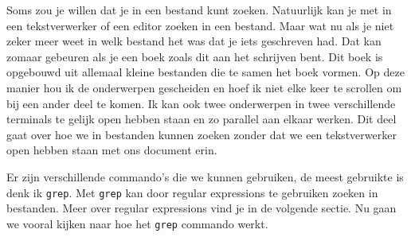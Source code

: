 
Soms zou je willen dat je in een bestand kunt zoeken. Natuurlijk kan je met in een tekstverwerker of een editor zoeken in een bestand. Maar wat nu als je niet zeker meer weet in welk bestand het was dat je iets geschreven had. Dat kan zomaar gebeuren als je een boek zoals dit aan het schrijven bent. Dit boek is opgebouwd uit allemaal kleine bestanden die te samen het boek vormen. Op deze manier hou ik de onderwerpen gescheiden en hoef ik niet elke keer te scrollen om bij een ander deel te komen. Ik kan ook twee onderwerpen in twee verschillende terminals te gelijk open hebben staan en zo parallel aan elkaar werken. Dit deel gaat over hoe we in bestanden kunnen zoeken zonder dat we een tekstverwerker open hebben staan met ons document erin.

Er zijn verschillende commando's die we kunnen gebruiken, de meest gebruikte is denk ik \texttt{grep}. Met \texttt{grep} kan door regular expressions te gebruiken zoeken in bestanden. Meer over regular expressions vind je in de volgende sectie. Nu gaan we vooral kijken naar hoe het \texttt{grep} commando werkt.

